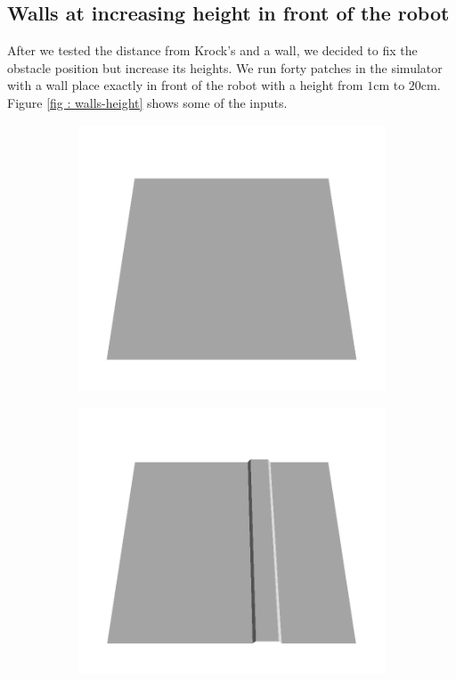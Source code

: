 \documentclass[../document.tex]{subfiles}
\begin{document}
\subsection{Walls at increasing height in front of the robot}
After we tested the distance from Krock's and a wall, we decided to fix the obstacle position but increase its heights.  We run forty patches in the simulator with a wall place exactly in front of the robot with a height from $1$cm to $20$cm. Figure \ref{fig : walls-height} shows some of the inputs.

\begin{figure}[htbp]
    \centering
    \begin{subfigure}[b]{0.24\linewidth}
    \includegraphics[width=\linewidth]{../img/5/custom_patches/walls_increasing/all/00-3d.png}
    \end{subfigure}
    \begin{subfigure}[b]{0.24\linewidth}
    \includegraphics[width=\linewidth]{../img/5/custom_patches/walls_increasing/all/03-3d.png}

\end{subfigure}
\end{figure}
\end{document}

